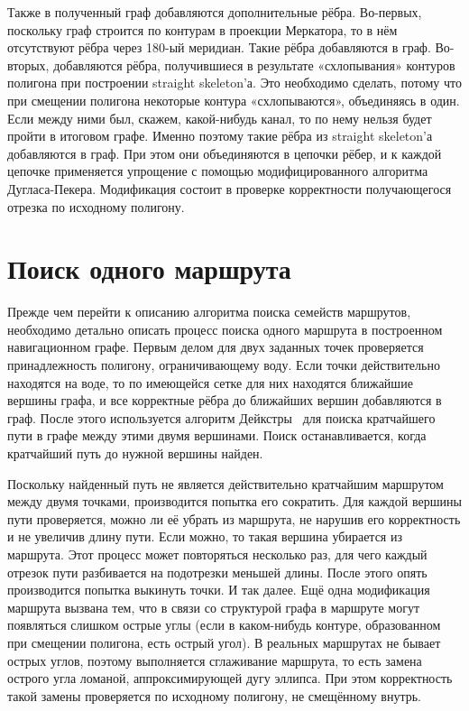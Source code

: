Также в полученный граф добавляются дополнительные рёбра. Во-первых,
поскольку граф строится по контурам в проекции Меркатора, то в нём
отсутствуют рёбра через 180-ый меридиан. Такие рёбра добавляются в
граф. Во-вторых, добавляются рёбра, получившиеся в результате
«схлопывания» контуров полигона при построении straight skeleton'а.
Это необходимо сделать, потому что при смещении полигона некоторые
контура «схлопываются», объединяясь в один. Если между ними был,
скажем, какой-нибудь канал, то по нему нельзя будет пройти в итоговом
графе. Именно поэтому такие рёбра из straight skeleton'а добавляются в
граф. При этом они объединяются в цепочки рёбер, и к каждой цепочке
применяется упрощение с помощью модифицированного алгоритма
Дугласа-Пекера. Модификация состоит в проверке корректности
получающегося отрезка по исходному полигону.

\FloatBarrier

\section{Поиск одного маршрута}

\label{sec:single-search}

Прежде чем перейти к описанию алгоритма поиска семейств маршрутов,
необходимо детально описать процесс поиска одного маршрута в
построенном навигационном графе. Первым делом для двух заданных точек
проверяется принадлежность полигону, ограничивающему воду. Если точки
действительно находятся на воде, то по имеющейся сетке для них
находятся ближайшие вершины графа, и все корректные рёбра до ближайших
вершин добавляются в граф. После этого используется алгоритм
Дейкстры~\cite{dijkstra1959note} для поиска кратчайшего пути в графе между
этими двумя вершинами. Поиск останавливается, когда кратчайший путь до
нужной вершины найден.

Поскольку найденный путь не является действительно кратчайшим
маршрутом между двумя точками, производится попытка его сократить. Для
каждой вершины пути проверяется, можно ли её убрать из маршрута, не
нарушив его корректность и не увеличив длину пути. Если можно, то
такая вершина убирается из маршрута. Этот процесс может повторяться
несколько раз, для чего каждый отрезок пути разбивается на подотрезки
меньшей длины. После этого опять производится попытка выкинуть точки.
И так далее. Ещё одна модификация маршрута вызвана тем, что в связи со
структурой графа в маршруте могут появляться слишком острые углы (если
в каком-нибудь контуре, образованном при смещении полигона, есть
острый угол). В реальных маршрутах не бывает острых углов, поэтому
выполняется сглаживание маршрута, то есть замена острого угла ломаной,
аппроксимирующей дугу эллипса. При этом корректность такой замены
проверяется по исходному полигону, не смещённому внутрь.


